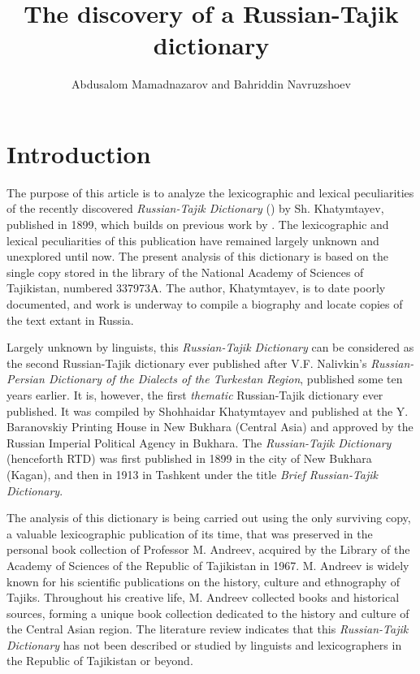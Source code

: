 \documentclass[output=paper,colorlinks,citecolor=brown,arabicfont,chinesefont]{langscibook}
\author{Abdusalom Mamadnazarov\affiliation{Tajik National University} and
        Bahriddin Navruzshoev\affiliation{Tajik National University}}
\title{The discovery of a Russian-Tajik dictionary}
\begin{document}
\maketitle

\section{Introduction}

The purpose of this article is to analyze the lexicographic and lexical peculiarities of the recently discovered \emph{Russian-Tajik Dictionary} (\citealt{RTD}) by Sh. Khatymtayev, published in 1899,  which builds on previous work by \citep{Mamadnazarov2013,Mamadnazarov2016,Mamadnazarov2021}. The lexicographic and lexical peculiarities of this publication have remained largely unknown and unexplored until now. The present analysis of this dictionary is based on the single copy stored in the library of the National Academy of Sciences of Tajikistan, numbered 337973A. The author, Khatymtayev, is to date poorly documented, and work is underway to compile a biography and locate copies of the text extant in Russia.

Largely unknown by linguists, this \emph{Russian-Tajik Dictionary} can be considered as the second Russian-Tajik dictionary ever published after V.F. Nalivkin's \emph{Russian-Persian Dictionary of the Dialects of the Turkestan Region}, published some ten years earlier. It is, however, the first \emph{thematic} Russian-Tajik dictionary ever published. It was compiled by Shohhaidar Khatymtayev and published at the Y. Baranovskiy Printing House in New Bukhara (Central Asia) and approved by the Russian Imperial Political Agency in Bukhara. The \emph{Russian-Tajik Dictionary} (henceforth RTD) was first published in 1899 in the city of New Bukhara (Kagan), and then in 1913 in Tashkent under the title \emph{Brief Russian-Tajik Dictionary}.

The analysis of this dictionary is being carried out using the only surviving copy, a valuable lexicographic publication of its time, that was preserved in the personal book collection of Professor M. Andreev, acquired by the Library of the Academy of Sciences of the Republic of Tajikistan in 1967. M. Andreev is widely known for his scientific publications on the history, culture and ethnography of Tajiks. Throughout his creative life, M. Andreev collected books and historical sources,  forming a unique book collection dedicated to the history and culture of the Central Asian region. The literature review indicates that this \emph{Russian-Tajik Dictionary} has not been described or studied by linguists and lexicographers in the Republic of Tajikistan or beyond.
\end{document}

